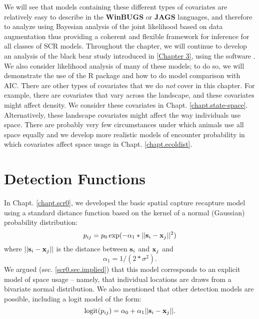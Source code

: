 We will see that models containing these different types of
covariates are relatively easy to describe in the {\bf WinBUGS} or
{\bf JAGS} languages, and
therefore to analyze using Bayesian analysis of the joint likelihood
based on data augmentation thus providing a coherent and flexible
framework for inference for all classes of SCR models.  Throughout the
chapter, we will continue to develop an analysis of the black bear
study introduced in \ref{Chapter 3}, using the software
\jags.  We also
consider likelihood analysis of many of these models; to do so, we
will demonstrate the use of the R package \secr and how to do model
comparison with AIC.
There are other types of covariates that we do {\it not} cover in this
chapter. For example, there are covariates that vary across the
landscape, and these covariates
might affect density. We consider these covariates in
Chapt. \ref{chapt.state-space}.
Alternatively, these landscape covariates might affect the way individuals use
space. There are probably very few circumstances under which animals use all space equally and we develop more realistic models of encounter
probability in which covariates affect space usage in Chapt. \ref{chapt.ecoldist}.


\section{Detection Functions}

In Chapt. \ref{chapt.scr0}, we developed the basic spatial capture recapture model using  a
standard distance function based on the kernel of a normal (Gaussian) probability
distribution:
\[
p_{ij} = p_{0} \exp(-\alpha_{1} *||{\bf s}_{i}-{\bf x}_{j}||^2)
\]
where $||{\bf s}_{i}-{\bf x}_{j}||$ is the distance between ${\bf
  s}_{i}$ and ${\bf x}_{j}$ and
\[
\alpha_{1} = 1/(2*\sigma^2).
\]
We argued (sec. \ref{scr0.sec.implied}) that this model
corresponds to an explicit model of space usage -- namely, that
individual locations are draws from a bivariate normal
distribution. We also mentioned that other detection models are
possible, including a logit model of the form:
\begin{equation}
	\mbox{logit}(p_{ij}) = \alpha_{0} + \alpha_1 ||{\bf s}_{i}-{\bf x}_{j} ||.
\label{covariates.eq.logit}
\end{equation}

